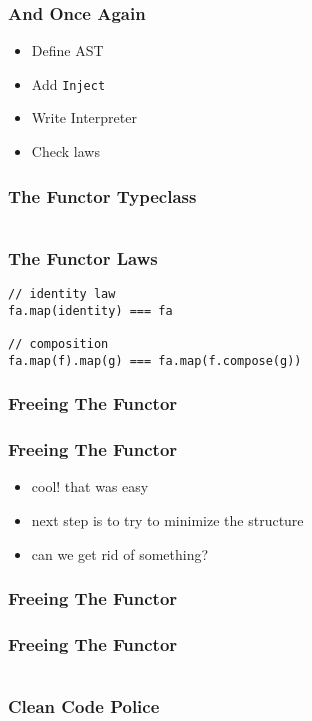\documentclass{beamer}
\newcommand{\recipe}{%
  \begin{itemize}
  \item Define AST
  \item Add \texttt{Inject}
  \item Write Interpreter
  \item Check laws
  \end{itemize}
}
\begin{document}
\begin{frame}[fragile]
  \frametitle{And Once Again}
  \recipe{}
\end{frame}

\begin{frame}[fragile]
  \frametitle{The Functor Typeclass}
  \inputminted{scala}{snippets/functor-typeclass.scala}
\end{frame}

\begin{frame}[fragile]
  \frametitle{The Functor Laws}
  \begin{verbatim}
// identity law
fa.map(identity) === fa

// composition
fa.map(f).map(g) === fa.map(f.compose(g))
  \end{verbatim}
\end{frame}

\begin{frame}[fragile]
  \frametitle{Freeing The Functor}
\end{frame}

\begin{frame}[fragile]
  \frametitle{Freeing The Functor}
  \begin{itemize}
  \item cool! that was easy
  \item next step is to try to minimize the structure
  \item can we get rid of something?
  \end{itemize}
\end{frame}

\begin{frame}[fragile]
  \frametitle{Freeing The Functor}
\end{frame}

\begin{frame}[fragile]
  \frametitle{Freeing The Functor}
  \inputminted{scala}{snippets/free-functor2.scala}
\end{frame}

\begin{frame}[fragile]
  \frametitle{Clean Code Police}
\end{frame}
\end{document}

